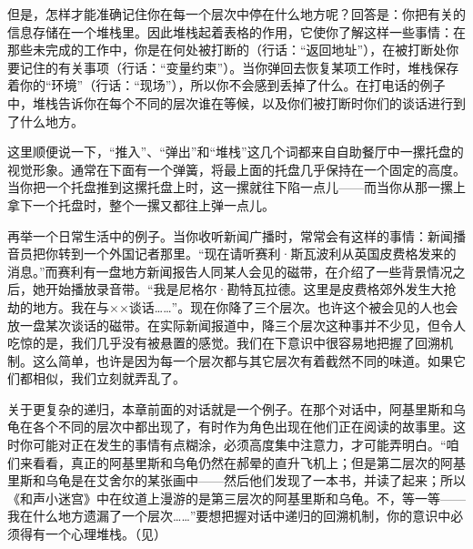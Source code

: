 但是，怎样才能准确记住你在每一个层次中停在什么地方呢？回答是：你把有关的信息存储在一个堆栈里。因此堆栈起着表格的作用，它使你了解这样一些事情：在那些未完成的工作中，你是在何处被打断的（行话：“返回地址”），在被打断处你要记住的有关事项（行话：“变量约束”）。当你弹回去恢复某项工作时，堆栈保存着你的“环境”（行话：“现场”），所以你不会感到丢掉了什么。在打电话的例子中，堆栈告诉你在每个不同的层次谁在等候，以及你们被打断时你们的谈话进行到了什么地方。

这里顺便说一下，“推入”、“弹出”和“堆栈”这几个词都来自自助餐厅中一摞托盘的视觉形象。通常在下面有一个弹簧，将最上面的托盘几乎保持在一个固定的高度。当你把一个托盘推到这摞托盘上时，这一摞就往下陷一点儿——而当你从那一摞上拿下一个托盘时，整个一摞又都往上弹一点儿。

再举一个日常生活中的例子。当你收听新闻广播时，常常会有这样的事情：新闻播音员把你转到一个外国记者那里。“现在请听赛利·斯瓦波利从英国皮费格发来的消息。”而赛利有一盘地方新闻报告人同某人会见的磁带，在介绍了一些背景情况之后，她开始播放录音带。“我是尼格尔·勘特瓦拉德。这里是皮费格郊外发生大抢劫的地方。我在与××谈话……”。现在你降了三个层次。也许这个被会见的人也会放一盘某次谈话的磁带。在实际新闻报道中，降三个层次这种事并不少见，但令人吃惊的是，我们几乎没有被悬置的感觉。我们在下意识中很容易地把握了回溯机制。这么简单，也许是因为每一个层次都与其它层次有着截然不同的味道。如果它们都相似，我们立刻就弄乱了。

关于更复杂的递归，本章前面的对话就是一个例子。在那个对话中，阿基里斯和乌龟在各个不同的层次中都出现了，有时作为角色出现在他们正在阅读的故事里。这时你可能对正在发生的事情有点糊涂，必须高度集中注意力，才可能弄明白。“咱们来看看，真正的阿基里斯和乌龟仍然在郝晕的直升飞机上；但是第二层次的阿基里斯和乌龟是在艾舍尔的某张画中——然后他们发现了一本书，并读了起来；所以《和声小迷宫》中在纹道上漫游的是第三层次的阿基里斯和乌龟。不，等一等——我在什么地方遗漏了一个层次……”要想把握对话中递归的回溯机制，你的意识中必须得有一个心理堆栈。（见）

